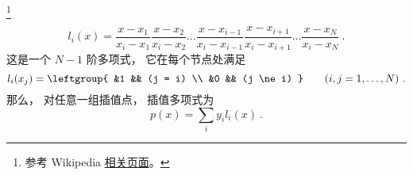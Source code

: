 

\footnote{参考 Wikipedia \href{https://en.wikipedia.org/wiki/Lagrange_polynomial}{相关页面}。}



\begin{equation}
l_i(x) = \frac{x-x_1}{x_i-x_1} \frac{x-x_2}{x_i-x_2}  \dots \frac{x-x_{i-1}}{x_i-x_{i-1}}\frac{x-x_{i+1}}{x_i-x_{i+1}} \dots \frac{x-x_N}{x_i-x_N}~.
\end{equation}
这是一个 $N-1$ 阶多项式， 它在每个节点处满足
\begin{equation}
l_i(x_j) = \leftgroup{
&1 && (j = i) \\
&0 && (j \ne i)
} \qquad (i,j=1,\dots,N)~.
\end{equation}
那么， 对任意一组插值点， 插值多项式为
\begin{equation}
p(x) = \sum_i y_i l_i(x)~.
\end{equation}

